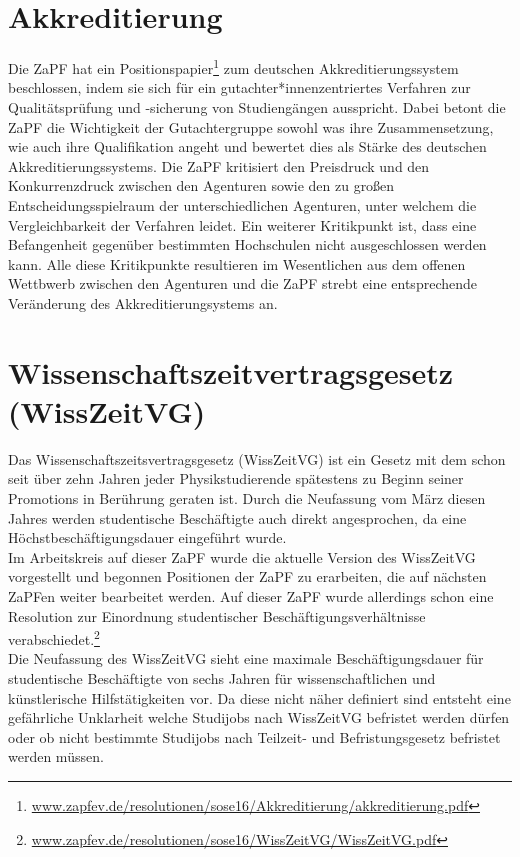 \section*{Akkreditierung}
Die ZaPF hat ein Positionspapier\footnote{\href{http://www.zapfev.de/resolutionen/sose16/Akkreditierung/akkreditierung.pdf}{\url{www.zapfev.de/resolutionen/sose16/Akkreditierung/akkreditierung.pdf}}} zum deutschen Akkreditierungssystem beschlossen, 
indem sie sich für ein gutachter*innenzentriertes Verfahren zur Qualitätsprüfung und -sicherung 
von Studiengängen ausspricht. Dabei betont die ZaPF die Wichtigkeit der Gutachtergruppe sowohl 
was ihre Zusammensetzung, wie auch ihre Qualifikation angeht und bewertet dies als Stärke 
des deutschen Akkreditierungssystems. Die ZaPF kritisiert den Preisdruck und den Konkurrenzdruck 
zwischen den Agenturen sowie den zu großen Entscheidungsspielraum der unterschiedlichen Agenturen, 
unter welchem die Vergleichbarkeit der Verfahren leidet. Ein weiterer Kritikpunkt 
ist, dass eine Befangenheit gegenüber bestimmten Hochschulen nicht ausgeschlossen werden kann. 
Alle diese Kritikpunkte resultieren im Wesentlichen aus dem offenen Wettbwerb zwischen 
den Agenturen und die ZaPF strebt eine entsprechende Veränderung des Akkreditierungsystems an.

\section*{Wissenschaftszeitvertragsgesetz (WissZeitVG)}
Das Wissenschaftszeitsvertragsgesetz (WissZeitVG) ist ein Gesetz mit dem schon seit über 
zehn Jahren jeder Physikstudierende spätestens zu Beginn seiner Promotions in Berührung geraten ist. 
Durch die Neufassung vom März diesen Jahres werden studentische Beschäftigte auch direkt angesprochen, 
da eine Höchstbeschäftigungsdauer eingeführt wurde.\\

Im Arbeitskreis auf dieser ZaPF wurde die aktuelle Version des WissZeitVG vorgestellt und 
begonnen Positionen der ZaPF zu erarbeiten, die auf nächsten ZaPFen weiter bearbeitet werden. 
Auf dieser ZaPF wurde allerdings schon eine Resolution zur Einordnung studentischer Beschäftigungsverhältnisse verabschiedet.\footnote{\href{http://www.zapfev.de/resolutionen/sose16/WissZeitVG/WissZeitVG.pdf}{\url{www.zapfev.de/resolutionen/sose16/WissZeitVG/WissZeitVG.pdf}}}\\

Die Neufassung des WissZeitVG sieht eine maximale Beschäftigungsdauer für studentische 
Beschäftigte von sechs Jahren für wissenschaftlichen und künstlerische Hilfstätigkeiten vor. 
Da diese nicht näher definiert sind entsteht eine gefährliche Unklarheit welche Studijobs nach 
WissZeitVG befristet werden dürfen oder ob nicht bestimmte Studijobs nach Teilzeit- und Befristungsgesetz befristet werden müssen.\\

